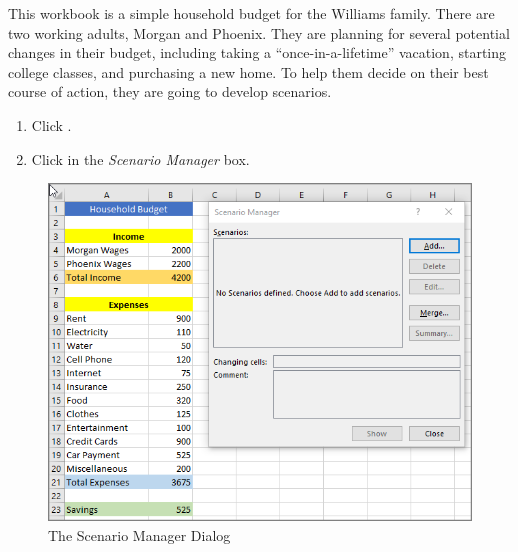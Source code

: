 This workbook is a simple household budget for the Williams family. There are two working adults, Morgan and Phoenix. They are planning for several potential changes in their budget, including taking a ``once-in-a-lifetime'' vacation, starting college classes, and purchasing a new home. To help them decide on their best course of action, they are going to develop scenarios.

\begin{enumerate}[resume]
	\item Click .
	\item Click  in the \textit{Scenario Manager} box.
\end{enumerate}

\begin{figure}[H]
	\centering
	\includegraphics[width=\maxwidth{.95\linewidth}]{gfx/ch08_fig50}
	\caption{The Scenario Manager Dialog}
	\label{08:fig50}
\end{figure}

